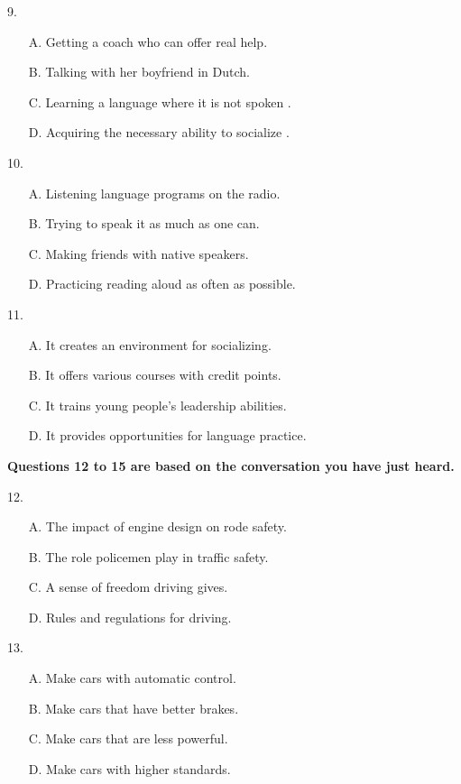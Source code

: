 \documentclass[UTF8,11pt]{ctexart}
\begin{document}
9.


\begin{itemize}[leftmargin=2em,itemsep=.2em,topsep=.4em]\item[A.] Getting a coach who can offer real help.
\item[B.] Talking with her boyfriend in Dutch.
\item[C.] Learning a language where it is not spoken .
\item[D.] Acquiring the necessary ability to socialize .
\end{itemize}

10.


\begin{itemize}[leftmargin=2em,itemsep=.2em,topsep=.4em]\item[A.] Listening language programs on the radio.
\item[B.] Trying to speak it as much as one can.
\item[C.] Making friends with native speakers.
\item[D.] Practicing reading aloud as often as possible.
\end{itemize}

11.


\begin{itemize}[leftmargin=2em,itemsep=.2em,topsep=.4em]\item[A.] It creates an environment for socializing.
\item[B.] It offers various courses with credit points.
\item[C.] It trains young people’s leadership abilities.
\item[D.] It provides opportunities for language practice.
\end{itemize}

\textbf{Questions 12 to 15 are based on the conversation you have just heard.}


12.


\begin{itemize}[leftmargin=2em,itemsep=.2em,topsep=.4em]\item[A.] The impact of engine design on rode safety.
\item[B.] The role policemen play in traffic safety.
\item[C.] A sense of freedom driving gives.
\item[D.] Rules and regulations for driving.
\end{itemize}

13.


\begin{itemize}[leftmargin=2em,itemsep=.2em,topsep=.4em]\item[A.] Make cars with automatic control.
\item[B.] Make cars that have better brakes.
\item[C.] Make cars that are less powerful.
\item[D.] Make cars with higher standards.
\end{itemize}
\end{document}
